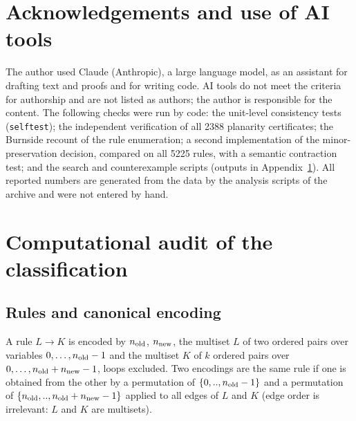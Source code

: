 \documentclass[10pt]{article}
\theoremstyle{definition}
\theoremstyle{plain}
\theoremstyle{remark}
\begin{document}
\section*{Acknowledgements and use of AI tools}
The author used Claude (Anthropic), a large language model, as an assistant for drafting text and proofs and for writing code. AI tools do not meet the criteria for authorship and are not listed as authors; the author is responsible for the content. The following checks were run by code: the unit-level consistency tests (\texttt{selftest}); the independent verification of all 2388 planarity certificates; the Burnside recount of the rule enumeration; a second implementation of the minor-preservation decision, compared on all 5225 rules, with a semantic contraction test; and the search and counterexample scripts (outputs in Appendix~\ref{app:audit}). All reported numbers are generated from the data by the analysis scripts of the archive and were not entered by hand.

\FloatBarrier


\clearpage
\appendix
\section{Computational audit of the classification}\label{app:audit}
\subsection{Rules and canonical encoding}
A rule $L\to K$ is encoded by $n_{\rm old}$, $n_{\rm new}$, the multiset $L$ of two ordered pairs over variables $0,\dots,n_{\rm old}-1$ and the multiset $K$ of $k$ ordered pairs over $0,\dots,n_{\rm old}+n_{\rm new}-1$, loops excluded. Two encodings are the same rule if one is obtained from the other by a permutation of $\{0,..,n_{\rm old}-1\}$ and a permutation of $\{n_{\rm old},..,n_{\rm old}+n_{\rm new}-1\}$ applied to all edges of $L$ and $K$ (edge order is irrelevant: $L$ and $K$ are multisets).
\end{document}
